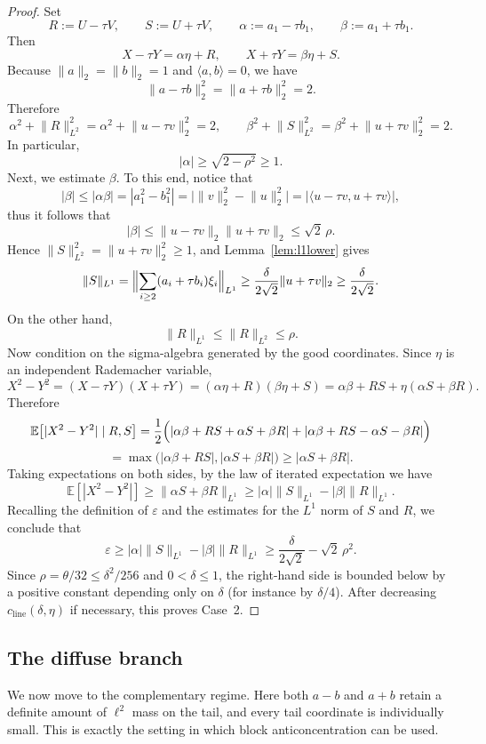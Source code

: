 \documentclass[11pt]{amsart}
\numberwithin{equation}{section}
\theoremstyle{definition}
\theoremstyle{remark}
\newcommand{\E}{\mathbb E}
\newcommand{\eps}{\varepsilon}
\newcommand{\abs}[1]{\lvert #1 \rvert}
\newcommand{\norm}[1]{\lVert #1 \rVert}
\newcommand{\ip}[2]{\langle #1,#2\rangle}
\begin{document}
\begin{proof}
Set
\[
R:=U-\tau V,
\qquad
S:=U+\tau V,
\qquad
\alpha:=a_1-\tau b_1,
\qquad
\beta:=a_1+\tau b_1.
\]
Then
\[
X-\tau Y=\alpha\eta+R,
\qquad
X+\tau Y=\beta\eta+S.
\]
Because $\norm{a}_2=\norm{b}_2=1$ and $\ip{a}{b}=0$, we have
\[
\norm{a-\tau b}_2^2=\norm{a+\tau b}_2^2=2.
\]
Therefore
\[
\alpha^2+\norm{R}_{L^2}^2
=\alpha^2+\norm{u-\tau v}_2^2
=2,
\qquad
\beta^2+\norm{S}_{L^2}^2
=\beta^2+\norm{u+\tau v}_2^2
=2.
\]
In particular,
\[
|\alpha|\ge \sqrt{2-\rho^2}\ge1.
\]
Next, we estimate $\beta$. To this end, notice that
\[
|\beta|\le |\alpha\beta|
=|a_1^2-b_1^2|
=\bigl|\norm{v}_2^2-\norm{u}_2^2\bigr|
=\bigl|\langle u-\tau v,u+\tau v\rangle\bigr|,
\]
thus it follows that
\[
|\beta|
\le \norm{u-\tau v}_2\norm{u+\tau v}_2
\le \sqrt2\,\rho.
\]
Hence $\norm{S}_{L^2}^2 = \|u+\tau v\|_2^2\ge1$, and Lemma~\ref{lem:l1lower} gives
\[
\norm{S}_{L^1}
=\Bigl\|\sum_{i\ge2}(a_i+\tau b_i)\xi_i\Bigr\|_{L^1}
\ge \frac{\delta}{2\sqrt2}\norm{u+\tau v}_2
\ge \frac{\delta}{2\sqrt2}.
\]
On the other hand,
\[
\norm{R}_{L^1}\le \norm{R}_{L^2}\le \rho.
\]
Now condition on the sigma-algebra generated by the good coordinates.  Since
$\eta$ is an independent Rademacher variable,
\[
X^2-Y^2
=(X-\tau Y)(X+\tau Y)
=(\alpha\eta+R)(\beta\eta+S)
=\alpha\beta+RS+\eta(\alpha S+\beta R).
\]
Therefore
\[
\E\bigl[\abs{X^2-Y^2}\mid R,S\bigr]
=\frac12\Bigl(
\abs{\alpha\beta+RS+\alpha S+\beta R}
+
\abs{\alpha\beta+RS-\alpha S-\beta R}
\Bigr)
\]
\[
=\max\bigl(\abs{\alpha\beta+RS},\abs{\alpha S+\beta R}\bigr)
\ge \abs{\alpha S+\beta R}.
\]
Taking expectations on both sides, by the law of iterated expectation we have 
\begin{equation*}
\E[|X^2-Y^2|]\ge \|\alpha S+\beta R\|_{L^1}\ge  |\alpha|\|S\|_{L^1}-|\beta|\|R\|_{L^1}.
\end{equation*}
Recalling the definition of $\varepsilon$ and the estimates for the $L^1$ norm of $S$ and $R$, we conclude that
\[
\eps
\ge |\alpha|\norm{S}_{L^1}-|\beta|\norm{R}_{L^1}
\ge \frac{\delta}{2\sqrt2}-\sqrt2\,\rho^2.
\]
Since $\rho=\theta/32\le \delta^2/256$ and $0<\delta\le1$, the right-hand side
is bounded below by a positive constant depending only on $\delta$ (for
instance by $\delta/4$).  After decreasing
$c_{\mathrm{line}}(\delta,\eta)$ if necessary, this proves Case~2.
\end{proof}

\subsection{The diffuse branch}

We now move to the complementary regime.  Here both $a-b$ and $a+b$ retain a
definite amount of $\ell^2$ mass on the tail, and every tail coordinate is
individually small.  This is exactly the setting in which block
anticoncentration can be used.
\end{document}
